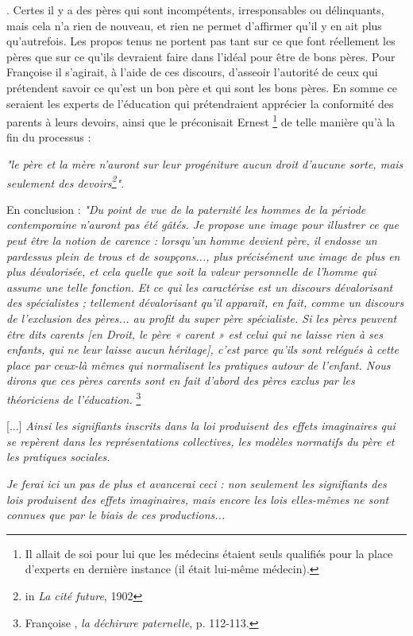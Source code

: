 . Certes il y a des pères qui sont incompétents, irresponsables ou délinquants, mais cela n'a rien de nouveau, et rien ne permet d'affirmer qu'il y en ait plus qu'autrefois. Les propos tenus ne portent pas tant sur ce que font réellement les pères que sur ce qu'ils devraient faire dans l'idéal pour être de bons pères. Pour Françoise  il s'agirait, à l'aide de ces discours, d'asseoir l'autorité de ceux qui prétendent savoir ce qu'est un bon père et qui sont les bons pères. En somme ce seraient les experts de l'éducation qui prétendraient apprécier la conformité des parents à leurs devoirs, ainsi que le préconisait Ernest \footnote{Il allait de soi pour lui que les médecins étaient seuls qualifiés pour la place d'experts en dernière instance (il était lui-même médecin).} de telle manière qu'à la fin du processus : {\emph{"le père et la mère n'auront sur leur progéniture aucun droit d'aucune sorte, mais seulement des devoirs\footnote{in \emph{La cité future}, 1902}"}. 


 
\begin{displayquote} En conclusion :
\emph{"Du point de vue de la paternité les hommes de la période contemporaine n'auront pas été gâtés. Je propose une image pour illustrer ce que peut être la notion de carence : lorsqu'un homme devient père, il endosse un pardessus plein de trous et de soupçons..., plus précisément une image de plus en plus dévalorisée, et cela quelle que soit la valeur personnelle de l'homme qui assume une telle fonction. Et ce qui les caractérise est un discours dévalorisant des spécialistes ; tellement dévalorisant qu'il apparaît, en fait, comme un discours de l'exclusion des pères... au profit du super père spécialiste. Si les pères peuvent être dits carents \emph{[en Droit, le père « carent » est celui qui ne laisse rien à ses enfants, qui ne leur laisse aucun héritage]}, c'est parce qu'ils sont relégués à cette place par ceux-là mêmes qui normalisent les pratiques autour de l'enfant. Nous dirons que ces pères carents sont en fait d'abord des pères exclus par les théoriciens de l'éducation.}%
\footnote{Françoise , \emph{la déchirure paternelle}, p. 112-113.} 

[...] \emph{Ainsi les signifiants inscrits dans la loi produisent des effets imaginaires qui se repèrent dans les représentations collectives, les modèles normatifs du père et les pratiques sociales.} 

\emph{Je ferai ici un pas de plus et avancerai ceci : non seulement les signifiants des lois produisent des effets imaginaires, mais encore les lois elles-mêmes ne sont connues que par le biais de ces productions...}


\end{displayquote}}
